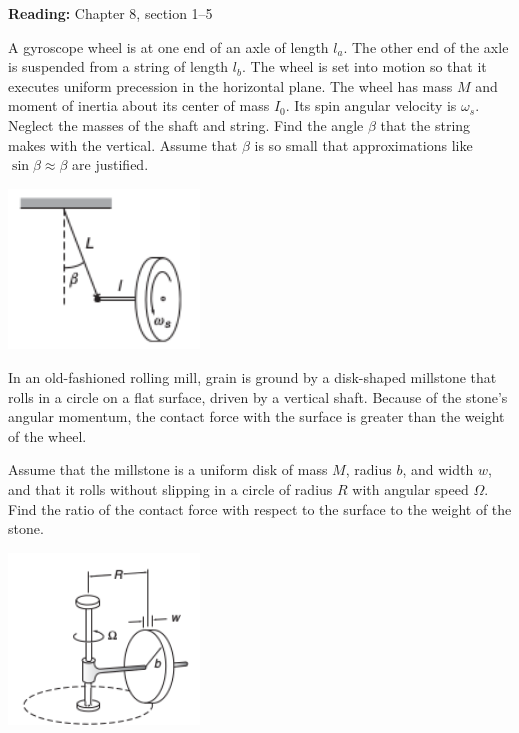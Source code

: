 \documentclass[12pt,letterpaper]{hmcpset}
\begin{document}

\noindent
\textbf{Reading:} Chapter 8, section 1--5


\begin{problem}
    A gyroscope wheel is at one end of an axle of length
    $l_{a}$. The other end of the axle is suspended from
    a string of length $l_{b}$. The wheel is set into motion
    so that it executes uniform precession in the horizontal
    plane. The wheel has mass $M$ and moment of inertia about
    its center of mass $I_{0}$. Its spin angular velocity is 
    $\omega_{s}$. Neglect the masses of the shaft and string.
    Find the angle $\beta$ that the string makes with the vertical.
    Assume that $\beta$ is so small that approximations like
    $\sin\beta \approx \beta$ are justified.

    \begin{center}
        \includegraphics[width=2in]{img/8_3}
    \end{center}
\end{problem}
\begin{solution}
    \vfill
\end{solution}
\clearpage

\begin{problem}
    In an old-fashioned rolling mill, grain is ground
    by a disk-shaped millstone that rolls in a circle 
    on a flat surface, driven by a vertical shaft. Because
    of the stone's angular momentum, the contact force 
    with the surface is greater than the weight of the wheel.

    Assume that the millstone is a uniform disk of mass $M$, 
    radius $b$, and width $w$, and that it rolls without 
    slipping in a circle of radius $R$ with angular speed 
    $\Omega$. Find the ratio of the contact force with respect
    to the surface to the weight of the stone.

    \begin{center}
        \includegraphics[width=2in]{img/8_4}
    \end{center}
\end{problem}
\begin{solution}
    \vfill
\end{solution}
\clearpage
\end{document}
